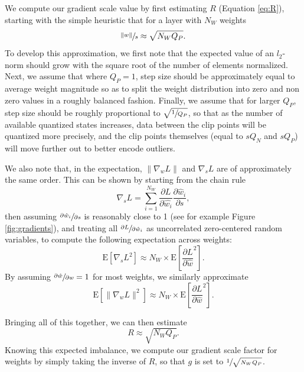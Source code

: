 \documentclass{article}
\begin{document}
We compute our gradient scale value by first estimating $R$ (Equation \ref{eq:R}), starting with the simple heuristic that for a layer with $N_W$ weights
\begin{equation}
\sfrac{\lVert w \rVert}{ s } \approx \sqrt{N_W Q_P}.
\end{equation}
%
To develop this approximation, we first note that the expected value of an $l_2$-norm should grow with the square root of the number of elements normalized.
%
Next, we assume that where $Q_P=1$, step size should be approximately equal to average weight magnitude so as to split the weight distribution into zero and non zero values in a roughly balanced fashion.
%
Finally, we assume that for larger $Q_P$, step size should be roughly proportional to $\sqrt{\sfrac{1}{Q_P}}$, so that as the number of available quantized states increases, data between the clip points will be quantized more precisely, and the clip points themselves (equal to $sQ_N$ and $sQ_P$) will move further out to better encode outliers.

We also note that, in the expectation, $\lVert \nabla_w L \rVert$ and $\nabla_s L$ are of approximately the same order.
This can be shown by starting from the chain rule
\begin{equation}
	\nabla_s L = \sum_{i=1}^{N_W} \frac{\partial L}{\partial \hat{w_i}} \frac{\partial \hat{w}_i}{\partial s},
\end{equation}
%
then assuming $\sfrac{\partial \hat{w}_i}{\partial s}$ is reasonably close to 1 (see for example Figure \ref{fig:gradients}), and treating all $\sfrac{\partial L}{\partial \hat{w}_i}$ as uncorrelated zero-centered random variables, to compute the following expectation across weights:
%
\begin{equation}
	\text{E} \left[  \nabla_s L^2 \right] \approx
		N_W \times \text{E} \left[ \frac{\partial L}{\partial \hat{w}}^2 \right].
\end{equation}
%
By assuming $\sfrac{\partial \hat{w}}{\partial w}=1$ for most weights, we similarly approximate
\begin{equation}
	\text{E} \left[ \lVert \nabla_w L \rVert^2 \right] \approx
		N_W \times \text{E} \left[ \frac{\partial L}{\partial \hat{w}}^2 \right].
\end{equation}

Bringing all of this together, we can then estimate
\begin{equation}
R \approx \sqrt{ N_W Q_P }.
\end{equation}
%
Knowing this expected imbalance, we compute our gradient scale factor for weights by simply taking the inverse of $R$, so that $g$ is set to $\sfrac{1}{\sqrt{N_WQ_P}}$.
\end{document}
